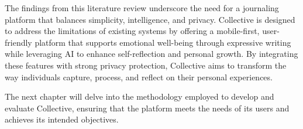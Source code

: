 The findings from this literature review underscore the need for a journaling platform that balances simplicity, intelligence, and privacy. Collective is designed to address the limitations of existing systems by offering a mobile-first, user-friendly platform that supports emotional well-being through expressive writing while leveraging AI to enhance self-reflection and personal growth. By integrating these features with strong privacy protection, Collective aims to transform the way individuals capture, process, and reflect on their personal experiences.

The next chapter will delve into the methodology employed to develop and evaluate Collective, ensuring that the platform meets the needs of its users and achieves its intended objectives.
